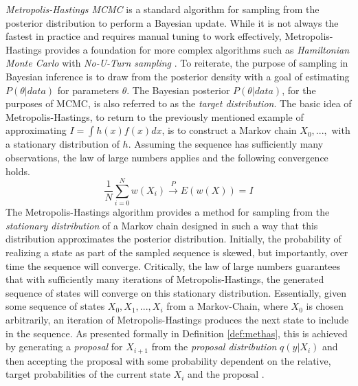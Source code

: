 \documentclass[
  12pt,
]{book}
\theoremstyle{definition}
\theoremstyle{definition}
\theoremstyle{definition}
\theoremstyle{remark}
\begin{document}
\emph{Metropolis-Hastings MCMC} is a standard algorithm for sampling from the posterior distribution to perform a Bayesian update.
While it is not always the fastest in practice and requires manual tuning to work effectively, Metropolis-Hastings provides a foundation for more complex algorithms such as \emph{Hamiltonian Monte Carlo} \citep{Brooks2011} with \emph{No-U-Turn sampling} \citep{Homan2014}.
To reiterate, the purpose of sampling in Bayesian inference is to draw from the posterior density with a goal of estimating \(P(\theta|data)\) for parameters \(\theta\).
The Bayesian posterior \(P(\theta|data)\), for the purposes of MCMC, is also referred to as the \emph{target distribution}.
The basic idea of Metropolis-Hastings, to return to the previously mentioned example of approximating \(I=\int h(x)f(x)dx\), is to construct a Markov chain \(X_0,...,\) with a stationary distribution of \(h\).
Assuming the sequence has sufficiently many observations, the law of large numbers applies and the following convergence holds.
\[\frac{1}{N}\sum_{i=0}^{N}w(X_{i})\xrightarrow{P} E(w(X))=I\]
The Metropolis-Hastings algorithm provides a method for sampling from the \emph{stationary distribution} of a Markov chain designed in such a way that this distribution approximates the posterior distribution.
Initially, the probability of realizing a state as part of the sampled sequence is skewed, but importantly, over time the sequence will converge.
Critically, the law of large numbers guarantees that with sufficiently many iterations of Metropolis-Hastings, the generated sequence of states will converge on this stationary distribution.
Essentially, given some sequence of states \(X_{0},X_{1},...,X_{i}\) from a Markov-Chain, where \(X_{0}\) is chosen arbitrarily, an iteration of Metropolis-Hastings produces the next state to include in the sequence.
As presented formally in Definition \ref{def:methas}, this is achieved by generating a \emph{proposal} for \(X_{i+1}\) from the \emph{proposal distribution} \(q(y|X_{i})\) and then accepting the proposal with some probability dependent on the relative, target probabilities of the current state \(X_{i}\) and the proposal \citep{Wasserman2004}.
\end{document}
